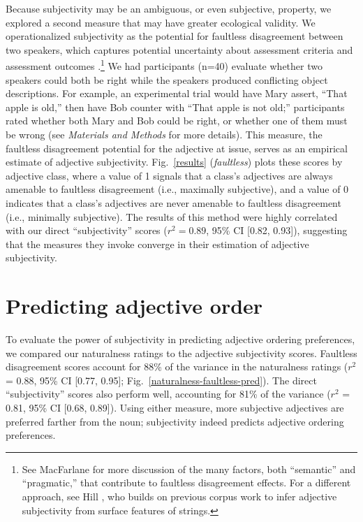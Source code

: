\documentclass{pnastwo}
\begin{document}
\begin{article}
Because subjectivity may be an ambiguous, or even subjective, property, we explored a second measure that may have greater ecological validity. 
We operationalized subjectivity as the potential for faultless disagreement between two speakers, which captures potential uncertainty about assessment criteria and assessment outcomes \cite{kolbel2002,kennedy2013,barker2013}.\footnote{See MacFarlane \cite{macfarlane2014} for more discussion of the many factors, both ``semantic'' and ``pragmatic,'' that contribute to faultless disagreement effects. For a different approach, see Hill \cite{hill2012}, who builds on previous corpus work \cite{wulff2003} to infer adjective subjectivity from surface features of strings.}
We had participants (n=40) evaluate whether two speakers could both be right while the speakers produced conflicting object descriptions. For example, an experimental trial would have Mary assert, ``That apple is old,'' then have Bob counter with ``That apple is not old;'' 
participants rated whether both Mary and Bob could be right, or whether one of them must be wrong (see \emph{Materials and Methods} for more details). This measure, the faultless disagreement potential for the adjective at issue, serves as an empirical estimate of adjective subjectivity. 
Fig.\ \ref{results} (\emph{faultless}) plots these scores by adjective class, where a value of 1 signals that a class's adjectives are always amenable to faultless disagreement (i.e., maximally subjective), and a value of 0 indicates that a class's adjectives are never amenable to faultless disagreement (i.e., minimally subjective).
The results of this method were highly correlated with our direct ``subjectivity'' scores ($r^{2} = 0.89$, 95\% CI [0.82, 0.93]), suggesting that the measures they invoke converge in their estimation of adjective subjectivity. %

\section{Predicting adjective order}

To evaluate the power of subjectivity in predicting adjective ordering preferences, we compared our naturalness ratings to the adjective subjectivity scores.
Faultless disagreement scores account for  88\% of the variance in the naturalness ratings ($r^2$ = 0.88, 95\% CI [0.77, 0.95]; Fig.~\ref{naturalness-faultless-pred}).
The direct ``subjectivity'' scores also perform well, accounting for 81\% of the variance ($r^2$ = 0.81, 95\% CI [0.68, 0.89]).
Using either measure, more subjective adjectives are preferred farther from the noun; subjectivity indeed predicts adjective ordering preferences.


\end{article}
\end{document}
